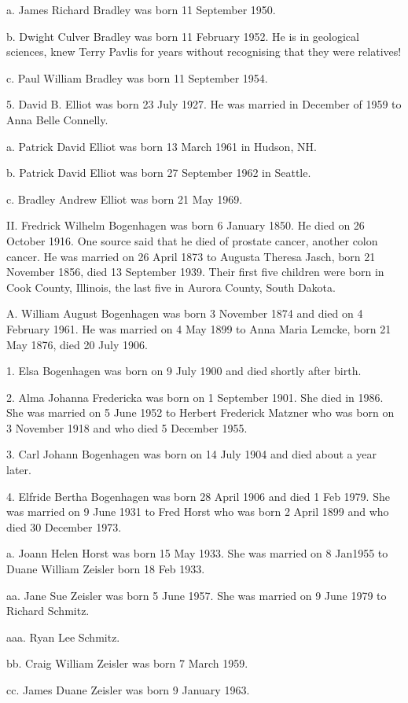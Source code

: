 \documentclass[a4paper]{article}
\begin{document}
a. James Richard Bradley was born 11 September 1950.

b. Dwight Culver Bradley was born 11 February 1952.  He is in geological sciences,  knew Terry Pavlis for years without recognising that they were relatives!

c. Paul William Bradley was born 11 September 1954.

5. David B. Elliot was born 23 July 1927.  He was married in December of 1959 to Anna Belle Connelly.

a. Patrick David Elliot was born 13 March 1961 in Hudson, NH.

b. Patrick David Elliot was born 27 September 1962 in Seattle.

c. Bradley Andrew Elliot was born 21 May 1969.

II. Fredrick Wilhelm Bogenhagen was born 6 January 1850.  He died on 26 October 1916. One source said that he died of prostate cancer, another colon cancer.  He was married on 26 April 1873 to Augusta Theresa Jasch, born 21 November 1856, died 13 September 1939.  Their first five children were born in Cook County, Illinois, the last five in Aurora County, South Dakota.

A. William August Bogenhagen was born 3 November 1874 and died on 4 February 1961.  	He was married on 4 May 1899 to Anna Maria Lemcke, born 21 May 1876, died 20 July 1906.

1. Elsa Bogenhagen was born on 9 July 1900 and died shortly after birth.

2. Alma Johanna Fredericka was born on 1 September 1901. She died in 1986. She was married on 5 June 1952 to Herbert Frederick Matzner who was born on 3 November 1918 and who died 5 December 1955.

3. Carl Johann Bogenhagen was born on 14 July 1904 and died about a year later.

4. Elfride Bertha Bogenhagen was born 28 April 1906 and died 1 Feb 1979.  She was married on 9 June 1931 to Fred Horst who was born 2 April 1899 and who died 30 December 1973.

a. Joann Helen Horst was born 15 May 1933.  She was married on 8 Jan1955 to Duane William Zeisler born 18 Feb 1933.

aa. Jane Sue Zeisler was born 5 June 1957.  She was married on 9 June 1979 to Richard Schmitz.

aaa. Ryan Lee Schmitz.

bb. Craig William Zeisler was born 7 March 1959.

cc. James Duane Zeisler was born 9 January 1963.
\end{document}
